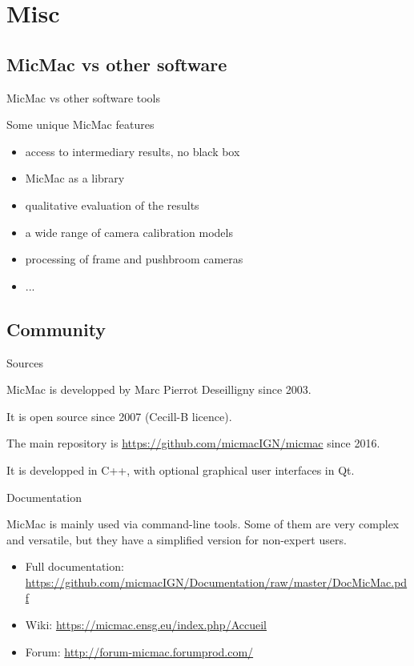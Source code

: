 \documentclass{beamer}
\begin{document}
	\section{Misc}
	\subsection*{MicMac vs other software}
		\begin{frame}{MicMac vs other software tools}
		
		Some unique MicMac features 
		\begin{itemize}
		\item access to intermediary results, no black box
		\item MicMac as a library
		\item qualitative evaluation of the results
		\item a wide range of camera calibration models
		\item processing of frame and pushbroom cameras
		\item ...
		\end{itemize}
		
		
		\end{frame}



		\subsection{Community}
		\begin{frame}{Sources}

			MicMac is developped by Marc Pierrot Deseilligny since 2003.

			It is open source since 2007 (Cecill-B licence).

			The main repository is \url{https://github.com/micmacIGN/micmac} since
			2016.

			It is developped in C++, with optional graphical user interfaces in Qt.

		\end{frame}

		\begin{frame}{Documentation}

			MicMac is mainly used via command-line tools. Some of them are very
			complex and versatile, but they have a simplified version for non-expert
			users.

			\begin{itemize}
			\item
			  Full documentation:
			  \url{https://github.com/micmacIGN/Documentation/raw/master/DocMicMac.pdf}
			\item
			  Wiki: \url{https://micmac.ensg.eu/index.php/Accueil}
			\item
			  Forum: \url{http://forum-micmac.forumprod.com/}
			\end{itemize}

		\end{frame}		 
\end{document}
